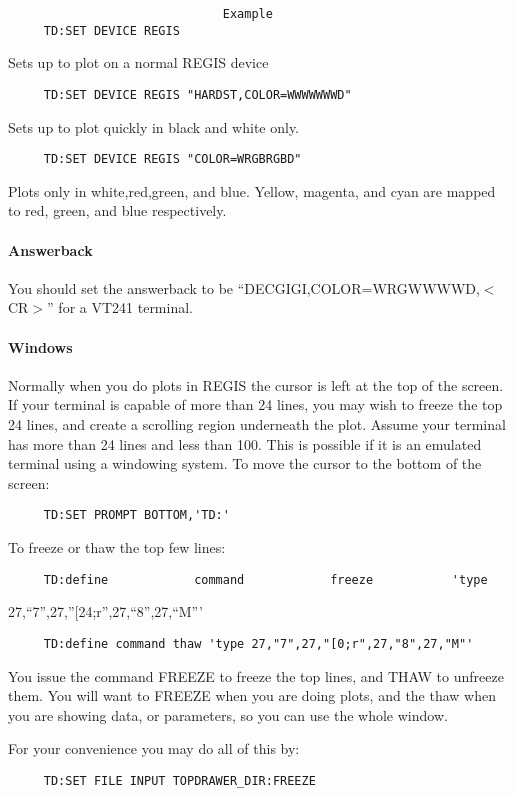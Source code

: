 \begin{verbatim}
                              Example
     TD:SET DEVICE REGIS 
\end{verbatim}
Sets up to plot on a normal REGIS device 
\begin{verbatim}
     TD:SET DEVICE REGIS "HARDST,COLOR=WWWWWWWD" 
\end{verbatim}
Sets up to plot quickly in black and white only.  
\begin{verbatim}
     TD:SET DEVICE REGIS "COLOR=WRGBRGBD" 
\end{verbatim}
Plots only in white,red,green, and blue.  Yellow, magenta, and cyan
are mapped to red, green, and blue respectively.  
\paragraph{Answerback}
You  should  set the answerback to be ``DECGIGI,COLOR=WRGWWWWD,$<$CR$>$''
for a VT241 terminal.  
\paragraph{Windows}
Normally  when  you do plots in REGIS the cursor is left at the top
of the screen.  If your terminal is capable of more than 24  lines,
you  may  wish  to  freeze the top 24 lines, and create a scrolling
region underneath the plot.  Assume your terminal has more than  24
lines  and  less  than  100.  This is possible if it is an emulated
terminal using a windowing system.   To  move  the  cursor  to  the
bottom of the screen:  
\begin{verbatim}
     TD:SET PROMPT BOTTOM,'TD:' 
\end{verbatim}
To freeze or thaw the top few lines:  
\begin{verbatim}
     TD:define            command            freeze           'type
\end{verbatim}
27,``7'',27,''[24;r'',27,``8'',27,``M''' 
\begin{verbatim}
     TD:define command thaw 'type 27,"7",27,"[0;r",27,"8",27,"M"' 
\end{verbatim}
You  issue  the command FREEZE to freeze the top lines, and THAW to
unfreeze them.  You will want to FREEZE when you are  doing  plots,
and  the  thaw when you are showing data, or parameters, so you can
use the whole window.  

For your convenience you may do all of this by:  
\begin{verbatim}
     TD:SET FILE INPUT TOPDRAWER_DIR:FREEZE 
\end{verbatim}

